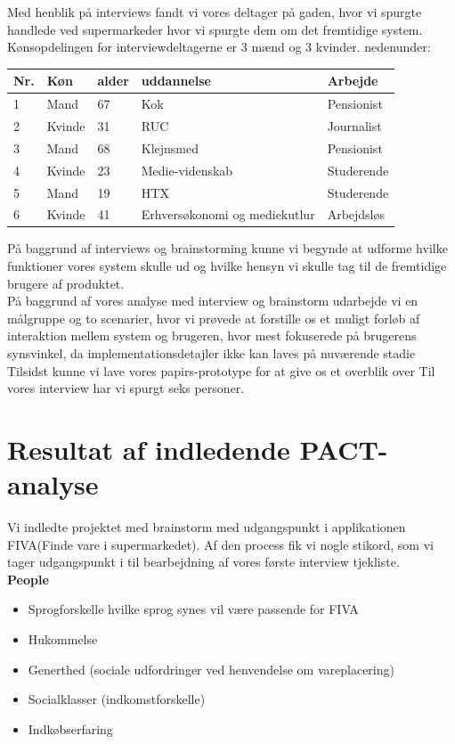 \documentclass[12pt]{article}
\begin{document}
Med henblik på interviews fandt vi vores deltager på gaden, hvor vi spurgte handlede ved supermarkeder hvor vi spurgte dem om det fremtidige system.\\
Kønsopdelingen for interviewdeltagerne er 3 mænd og 3 kvinder. nedenunder:
\begin{center}
    \begin{tabular}{ |l | l | l | l | l |}
    \hline
    \textbf{Nr.} & \textbf{Køn} & \textbf{alder} & \textbf{uddannelse} & \textbf{Arbejde}\\ \hline
    1 & Mand & 67 & Kok & Pensionist \\ \hline
    2 & Kvinde & 31 & RUC & Journalist \\ \hline
    3 & Mand & 68 & Klejnsmed & Pensionist \\ \hline
    4 & Kvinde & 23 & Medie-videnskab & Studerende \\ \hline
    5 & Mand & 19 & HTX & Studerende \\ \hline
    6 & Kvinde & 41 & Erhversøkonomi og mediekutlur & Arbejdsløs \\ \hline
     \end{tabular}
\end{center}
På baggrund af interviews og brainstorming kunne vi begynde at udforme hvilke funktioner vores system skulle ud og hvilke hensyn vi skulle tag til de fremtidige brugere af produktet.\\
På baggrund af vores analyse med interview og brainstorm udarbejde vi en målgruppe og to scenarier, hvor vi prøvede at forstille os et muligt forløb af interaktion mellem system og brugeren, hvor mest fokuserede på brugerens synsvinkel, da implementationsdetajler ikke kan laves på nuværende stadie\\
Tilsidst kunne vi lave vores papirs-prototype for at give os et overblik over
Til vores interview har vi spurgt seks personer. 
\newpage
\section{Resultat af indledende PACT-analyse}
Vi indledte projektet med brainstorm med udgangspunkt i applikationen FIVA(Finde vare i supermarkedet). Af den process fik vi nogle stikord, som vi tager udgangspunkt i til bearbejdning af vores første interview tjekliste.\\
 
\noindent \textbf{People}
\begin{itemize} 
\item Sprogforskelle hvilke sprog synes vil være passende for FIVA
\item Hukommelse 
\item Generthed (sociale udfordringer ved henvendelse om vareplacering)
\item Socialklasser (indkomstforskelle)
\item Indkøbserfaring\\
\end{itemize}
\end{document}
